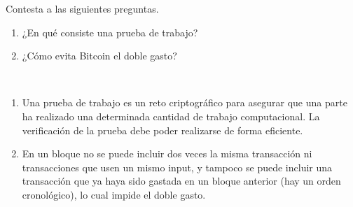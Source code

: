 \documentclass[twoside]{article}
\begin{document}
\newpage

\begin{ejercicio}{2}
	Contesta a las siguientes preguntas.
	\begin{enumerate}
		\item ¿En qué consiste una prueba de trabajo?
	\item  ¿Cómo evita Bitcoin el doble gasto?
\end{enumerate}
\end{ejercicio}
\begin{solucion}\
	\begin{enumerate}
		\item 	Una prueba de trabajo es un reto criptográfico para asegurar que una parte ha realizado una determinada cantidad de trabajo computacional. La verificación de la prueba debe poder realizarse de forma eficiente.
		\item En un bloque no se puede incluir dos veces la misma transacción ni transacciones que usen un mismo input, y tampoco se puede incluir una transacción que ya haya sido gastada en un bloque anterior (hay un orden cronológico), lo cual impide el doble gasto.
	\end{enumerate}
\end{solucion}
\end{document}
